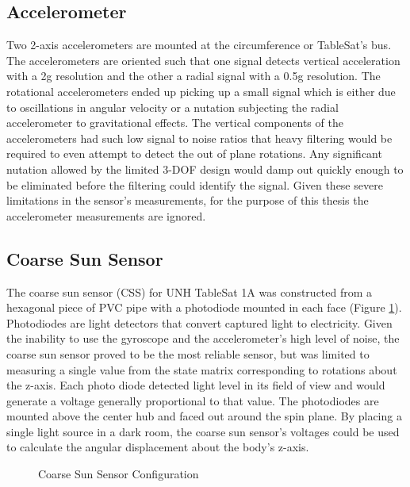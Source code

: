 \subsection{Accelerometer}
\label{subsec:Accelerometer}

Two 2-axis accelerometers are mounted at the circumference or TableSat's bus.  The accelerometers are oriented such that one signal detects vertical acceleration with a 2g resolution and the other a radial signal with a 0.5g resolution.  The rotational accelerometers ended up picking up a small signal which is either due to oscillations in angular velocity or a nutation subjecting the radial accelerometer to gravitational effects.  The vertical components of the accelerometers had such low signal to noise ratios that heavy filtering would be required to even attempt to detect the out of plane rotations.  Any significant nutation allowed by the limited 3-DOF design would damp out quickly enough to be eliminated before the filtering could identify the signal.  Given these severe limitations in the sensor's measurements, for the purpose of this thesis the accelerometer measurements are ignored.

\subsection{Coarse Sun Sensor}
\label{subsec:CoarseSunSensor}

The coarse sun sensor (CSS) for UNH TableSat 1A was constructed from a hexagonal piece of PVC pipe with a photodiode mounted in each face (Figure \ref{fig:CSS}).  Photodiodes are light detectors that convert captured light to electricity.  Given the inability to use the gyroscope and the accelerometer's high level of noise, the coarse sun sensor proved to be the most reliable sensor, but was limited to measuring a single value from the state matrix corresponding to rotations about the z-axis.  Each photo diode detected light level in its field of view and would generate a voltage generally proportional to that value.  The photodiodes are mounted above the center hub and faced out around the spin plane.  By placing a single light source in a dark room, the coarse sun sensor's voltages could be used to calculate the angular displacement about the body's z-axis.


\begin{figure}[H]
\centerline{}
\caption{Coarse Sun Sensor Configuration}
\label{fig:CSS}
\end{figure}

